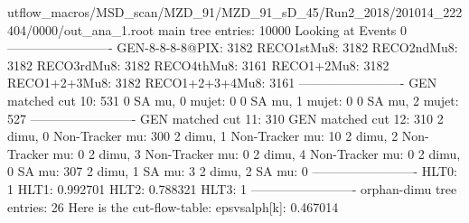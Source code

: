 utflow_macros/MSD_scan/MZD_91/MZD_91_sD_45/Run2_2018/201014_222404/0000/out_ana_1.root
main tree entries: 10000
Looking at Events 0
-------------------------
GEN-8-8-8-8@PIX: 3182
RECO1stMu8: 3182
RECO2ndMu8: 3182
RECO3rdMu8: 3182
RECO4thMu8: 3161
RECO1+2Mu8: 3182
RECO1+2+3Mu8: 3182
RECO1+2+3+4Mu8: 3161
-------------------------
GEN matched cut 10: 531
0 SA mu, 0 mujet: 0
0 SA mu, 1 mujet: 0
0 SA mu, 2 mujet: 527
-------------------------
GEN matched cut 11: 310
GEN matched cut 12: 310
2 dimu, 0 Non-Tracker mu: 300
2 dimu, 1 Non-Tracker mu: 10
2 dimu, 2 Non-Tracker mu: 0
2 dimu, 3 Non-Tracker mu: 0
2 dimu, 4 Non-Tracker mu: 0
2 dimu, 0 SA mu: 307
2 dimu, 1 SA mu: 3
2 dimu, 2 SA mu: 0
-------------------------
HLT0: 1
HLT1: 0.992701
HLT2: 0.788321
HLT3: 1
-------------------------
orphan-dimu tree entries: 26
Here is the cut-flow-table:
epsvsalph[k]: 0.467014
        
